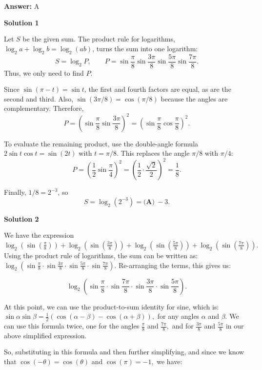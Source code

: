 \begin{enumerate}
 \textbf{Answer: }A



\textbf{Solution 1}

Let $S$ be the given sum. The product rule for logarithms,$\log_2 a+\log_2 b=\log_2(ab)$, turns the sum into one logarithm:
 \[S=\log_2 P,\qquad P=\sin\frac{\pi}{8}\sin\frac{3\pi}{8}\sin\frac{5\pi}{8}\sin\frac{7\pi}{8}.\]Thus, we only need to find $P$.

 Since $\sin(\pi-t)=\sin t$, the first and fourth factors are equal, as are the second and third. Also, $\sin(3\pi/8)=\cos(\pi/8)$ because the angles are complementary. Therefore,
 \[P=\left(\sin\frac{\pi}{8}\sin\frac{3\pi}{8}\right)^2 =\left(\sin\frac{\pi}{8}\cos\frac{\pi}{8}\right)^2.\]

 To evaluate the remaining product, use the double-angle formula$2\sin t\cos t=\sin(2t)$ with $t=\pi/8$. This replaces the angle $\pi/8$ with $\pi/4$:
 \[P=\left(\frac12\sin\frac{\pi}{4}\right)^2 =\left(\frac12\cdot\frac{\sqrt2}{2}\right)^2 =\frac18.\]

 Finally, $1/8=2^{-3}$, so
 \[S=\log_2(2^{-3})=\boxed{\textbf{(A)}\ -3}.\]




\textbf{Solution 2}

We have the expression $\log_{2}\left( \sin\left( \frac{\pi}{8} \right)  \right) + \log_{2}\left( \sin\left( \frac{3\pi}{8} \right)  \right) + \log_{2}\left( \sin\left( \frac{5\pi}{8} \right)  \right) + \log_{2}\left( \sin\left( \frac{7\pi}{8} \right)  \right).$ Using the product rule of logarithms, the sum can be written as: $\log_2 \left(\sin \frac{\pi}{8} \cdot \sin \frac{3 \pi}{8} \cdot \sin \frac{5 \pi}{8} \cdot \sin \frac{7 \pi}{8} \right).$ Re-arranging the terms, this gives us:

 
 \[\log_2 \left(\sin \frac{\pi}{8} \cdot \sin \frac{7 \pi}{8} \cdot \sin \frac{3 \pi}{8} \cdot \sin \frac{5 \pi}{8} \right).\] 

 At this point, we can use the product-to-sum identity for sine, which is: $\sin \alpha \sin \beta = \frac{1}{2} \left(\cos(\alpha - \beta) - \cos(\alpha + \beta) \right),$ for any angles $\alpha$ and $\beta.$ We can use this formula twice, one for the angles $\frac{\pi}{8}$ and $\frac{7 \pi}{8},$ and for $\frac{3 \pi}{8}$ and $\frac{5 \pi}{8}$ in our above simplified expression.

 So, substituting in this formula and then further simplifying, and since we know that $\cos(- \theta) = \cos(\theta)$ and $\cos(\pi) = - 1,$ we have:


\end{enumerate}
